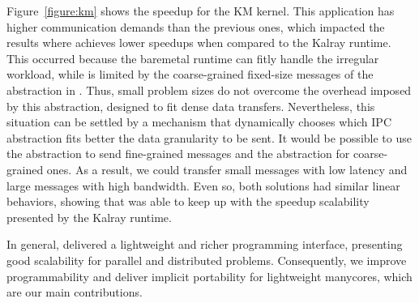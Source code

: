 	Figure~\ref{figure:km} shows the speedup for the KM kernel.
	This application has higher communication demands than the
	previous ones, which impacted the results where \lwmpi achieves lower
	speedups when compared to the Kalray runtime.
	This occurred because the baremetal
	runtime can fitly handle the irregular workload, while \lwmpi is
	limited by the coarse-grained fixed-size messages of the
	\portal abstraction in \nanvix.
	Thus, small problem sizes do not overcome the overhead imposed by
	this abstraction, designed to fit dense data transfers.
	Nevertheless, this situation can be settled by a mechanism that dynamically
	chooses which IPC abstraction fits better the data
	granularity to be sent. It would be possible to use the \mailbox
	abstraction to send fine-grained messages and the \portal abstraction for coarse-grained
	ones. As a result, we could transfer small messages with low latency and large messages
	with high bandwidth.
	Even so, both solutions had similar linear behaviors, showing that
	\lwmpi was able to keep up with the speedup scalability presented by
	the Kalray runtime.

	In general, \lwmpi delivered a lightweight and richer programming
	interface, presenting good scalability for parallel and
	distributed problems.
	Consequently, we improve programmability and deliver implicit
	portability for lightweight manycores, which are our main contributions.

